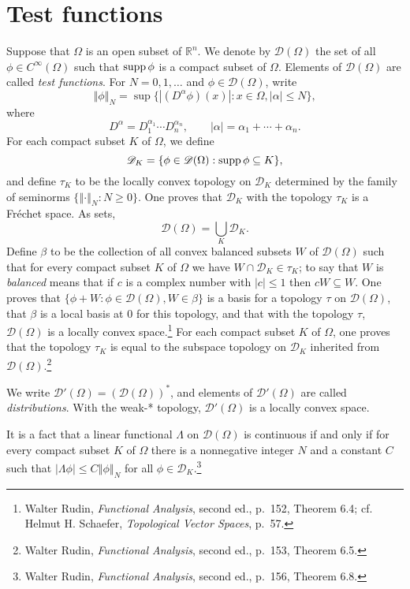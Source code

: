 \documentclass{article}
\newcommand{\supp}{\ensuremath\mathrm{supp}\,}
\newcommand{\norm}[1]{\left\Vert #1 \right\Vert}
\theoremstyle{definition}
\begin{document}
\section{Test functions}
Suppose that $\Omega$ is an open subset of $\mathbb{R}^n$. We denote by $\mathscr{D}(\Omega)$ the set of all $\phi \in C^\infty(\Omega)$ such that
$\supp \phi$ is a compact subset of $\Omega$. Elements of $\mathscr{D}(\Omega)$ are called {\em test functions}. For $N=0,1,\ldots$ and $\phi \in \mathscr{D}(\Omega)$, write
\[
\norm{\phi}_N = \sup\{|(D^\alpha \phi)(x)|: x\in \Omega, |\alpha| \leq N\},
\]
where
\[
D^\alpha = D_1^{\alpha_1} \cdots D_n^{\alpha_n}, \qquad |\alpha| = \alpha_1 + \cdots + \alpha_n.
\]
For each compact
subset $K$ of $\Omega$, we define
\[
\mathscr{D}_K = \{\phi \in \mathscr{D}(\Omega): \supp \phi \subseteq K\},
\] 
and define   $\tau_K$ to be the locally convex topology on $\mathscr{D}_K$ determined by the  family of seminorms $\{\norm{\cdot}_N: N \geq 0\}$. One proves that 
$\mathscr{D}_K$  with the topology $\tau_K$ is a Fr\'echet space. 
As sets,
\[
\mathscr{D}(\Omega)= \bigcup_K \mathscr{D}_K.
\]
Define $\beta$ to be the collection of all convex balanced subsets $W$ of $\mathscr{D}(\Omega)$ such that for every compact subset $K$ of $\Omega$ we have
$W\cap \mathscr{D}_K \in \tau_K$; to say that $W$ is {\em balanced} means that if $c$ is a complex number with $|c| \leq 1$ then
$cW \subseteq W$. One proves that
 $\{\phi+W: \phi \in \mathscr{D}(\Omega), W \in \beta\}$ is a basis for a topology $\tau$ on $\mathscr{D}(\Omega)$,  that  
 $\beta$ is a local basis at $0$ for this topology,
and that with the topology $\tau$,  $\mathscr{D}(\Omega)$ 
is a locally convex space.\footnote{Walter Rudin, {\em Functional Analysis}, second ed., p.~152, Theorem 6.4; cf. Helmut H. Schaefer,
{\em Topological Vector Spaces}, p.~57.} For each compact subset $K$ of $\Omega$,
 one proves that the topology $\tau_K$ is equal to the subspace topology on $\mathscr{D}_K$ inherited from
 $\mathscr{D}(\Omega)$.\footnote{Walter
 Rudin, {\em Functional Analysis}, second ed., p.~153, Theorem 6.5.} 

We write $\mathscr{D}'(\Omega)= (\mathscr{D}(\Omega))^*$, and elements of $\mathscr{D}'(\Omega)$ are called {\em distributions}. 
With the weak-* topology, $\mathscr{D}'(\Omega)$ is a locally convex space.

It is a fact that a linear functional  $\Lambda$ on $\mathscr{D}(\Omega)$ is continuous if and only if 
for every compact subset $K$ of $\Omega$ there is a nonnegative integer $N$ and a constant
$C$ such that $|\Lambda \phi| \leq C \norm{\phi}_N$ for all $\phi \in \mathscr{D}_K$.\footnote{Walter
Rudin, {\em Functional Analysis}, second ed., p.~156, Theorem 6.8.}
\end{document}
